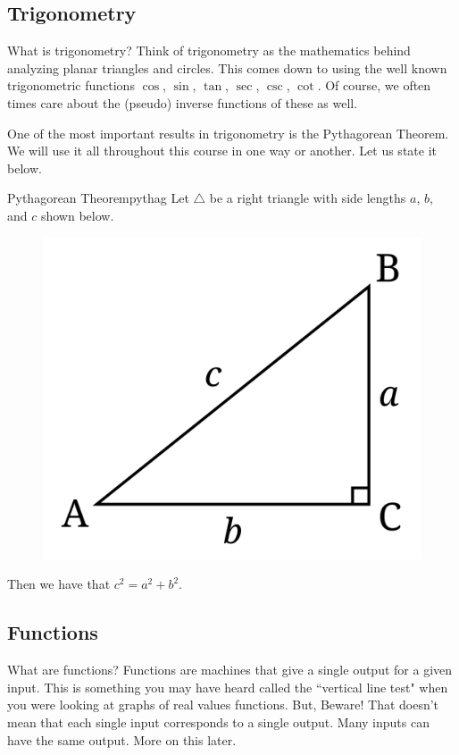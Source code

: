     \subsection{Trigonometry}
    
    What is trigonometry? Think of trigonometry as the mathematics behind analyzing planar triangles and circles.  This comes down to using the well known trigonometric functions $\cos$, $\sin$, $\tan$, $\sec$, $\csc$, $\cot$. Of course, we often times care about the (pseudo) inverse functions of these as well. 
    
    One of the most important results in trigonometry is the Pythagorean Theorem. We will use it all throughout this course in one way or another.  Let us state it below. 
    
    \begin{thm}{Pythagorean Theorem}{pythag}
    Let $\triangle$ be a right triangle with side lengths $a$, $b$, and $c$ shown below.
    \begin{figure}[H]
        \centering
        \includegraphics[width=.3\textwidth]{Figures_Part_1/right_triangle.png}
    \end{figure}
    Then we have that $c^2=a^2+b^2$.
    \end{thm}
    
    
    
    
    \subsection{Functions}
    
    What are functions? Functions are machines that give a single output for a given input. This is something you may have heard called the ``vertical line test" when you were looking at graphs of real values functions. But, Beware! That doesn't mean that each single input corresponds to a single output. Many inputs can have the same output. More on this later.
    
